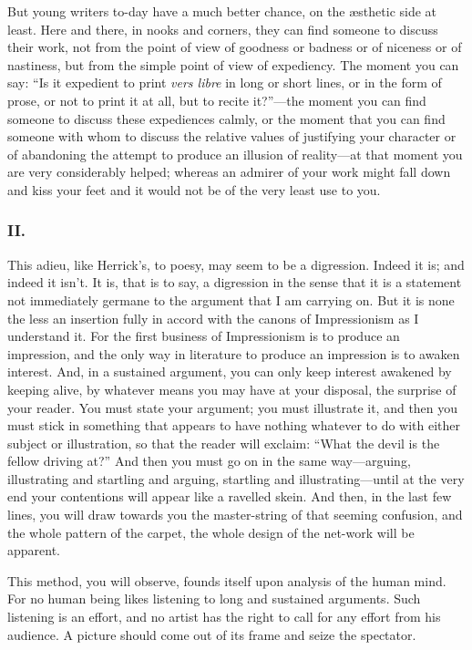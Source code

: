 But young writers to-day have a much better chance, on the æsthetic side
at least. Here and there, in nooks and corners, they can find someone to
discuss their work, not from the point of view of goodness or badness or
of niceness or of nastiness, but from the simple point of view of
expediency. The moment you can say: ``Is it expedient to print
\emph{vers libre} in long or short lines, or in the form of prose, or
not to print it at all, but to recite it?''---the moment you can find
someone to discuss these expediences calmly, or the moment that you can
find someone with whom to discuss the relative values of justifying your
character or of abandoning the attempt to produce an illusion of
reality---at that moment you are very considerably helped; whereas an
admirer of your work might fall down and kiss your feet and it would not
be of the very least use to you.

\subsubsection{II.}\label{ii.-1}

This adieu, like Herrick's, to poesy, may seem to be a digression.
Indeed it is; and indeed it isn't. It is, that is to say, a digression
in the sense that it is a statement not immediately germane to the
argument that I am carrying on. But it is none the less an insertion
fully in accord with the canons of Impressionism as I understand it. For
the first business of Impressionism is to produce an impression, and the
only way in literature to produce an impression is to awaken interest.
And, in a sustained argument, you can only keep interest awakened by
keeping alive, by whatever means you may have at your disposal, the
surprise of your reader. You must state your argument; you must
illustrate it, and then you must stick in something that appears to have
nothing whatever to do with either subject or illustration, so that the
reader will exclaim: ``What the devil is the fellow driving at?'' And
then you must go on in the same way---arguing, illustrating and
startling and arguing, startling and illustrating---until at the very
end your contentions will appear like a ravelled skein. And then, in the
last few lines, you will draw towards you the master-string of that
seeming confusion, and the whole pattern of the carpet, the whole design
of the net-work will be apparent.

This method, you will observe, founds itself upon analysis of the human
mind. For no human being likes listening to long and sustained
arguments. Such listening is an effort, and no artist has the right to
call for any effort from his audience. A picture should come out of its
frame and seize the spectator.

